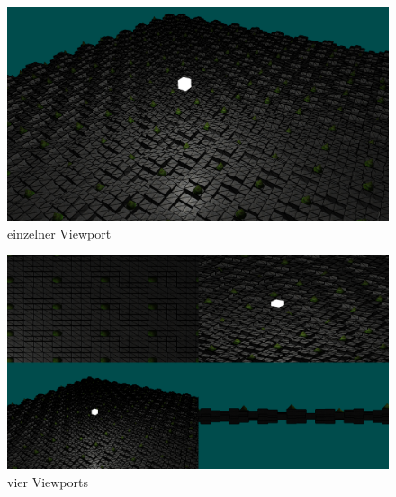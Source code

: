 \documentclass{article}
\begin{document}
\begin{minipage}{0.5\textwidth}
\begin{figure}[H]
    \includegraphics[scale=0.12]{vmode1.png}
    \caption{einzelner Viewport}
\end{figure}
\end{minipage}
\begin{minipage}{0.5\textwidth}
\begin{figure}[H]
    \includegraphics[scale=0.12]{vmode2.png}
    \caption{vier Viewports}
\end{figure}
\end{minipage}
\end{document}
